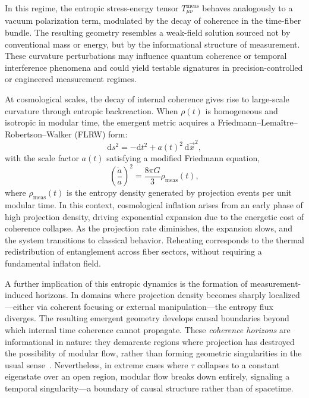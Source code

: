 \documentclass[11pt]{article}
\begin{document}
In this regime, the entropic stress-energy tensor \( T^{\mathrm{meas}}_{\mu\nu} \) behaves analogously to a vacuum polarization term, modulated by the decay of coherence in the time-fiber bundle. The resulting geometry resembles a weak-field solution sourced not by conventional mass or energy, but by the informational structure of measurement. These curvature perturbations may influence quantum coherence or temporal interference phenomena and could yield testable signatures in precision-controlled or engineered measurement regimes.


At cosmological scales, the decay of internal coherence gives rise to large-scale curvature through entropic backreaction. When \( \rho(t) \) is homogeneous and isotropic in modular time, the emergent metric acquires a Friedmann–Lemaître–Robertson–Walker (FLRW) form:
\begin{equation}
\mathrm{d}s^2 = -\mathrm{d}t^2 + a(t)^2 \, \mathrm{d}\vec{x}^2,
\end{equation}
with the scale factor \( a(t) \) satisfying a modified Friedmann equation,
\begin{equation}
\left( \frac{\dot{a}}{a} \right)^2 = \frac{8\pi G}{3} \rho_{\mathrm{meas}}(t),
\end{equation}
where \( \rho_{\mathrm{meas}}(t) \) is the entropy density generated by projection events per unit modular time. In this context, cosmological inflation arises from an early phase of high projection density, driving exponential expansion due to the energetic cost of coherence collapse. As the projection rate diminishes, the expansion slows, and the system transitions to classical behavior. Reheating corresponds to the thermal redistribution of entanglement across fiber sectors, without requiring a fundamental inflaton field.

A further implication of this entropic dynamics is the formation of measurement-induced horizons. In domains where projection density becomes sharply localized—either via coherent focusing or external manipulation—the entropy flux diverges. The resulting emergent geometry develops causal boundaries beyond which internal time coherence cannot propagate. These {\itshape coherence horizons} are informational in nature: they demarcate regions where projection has destroyed the possibility of modular flow, rather than forming geometric singularities in the usual sense~\cite{debianchi2024achronotopic}. Nevertheless, in extreme cases where \( \tau \) collapses to a constant eigenstate over an open region, modular flow breaks down entirely, signaling a temporal singularity—a boundary of causal structure rather than of spacetime.
\end{document}
